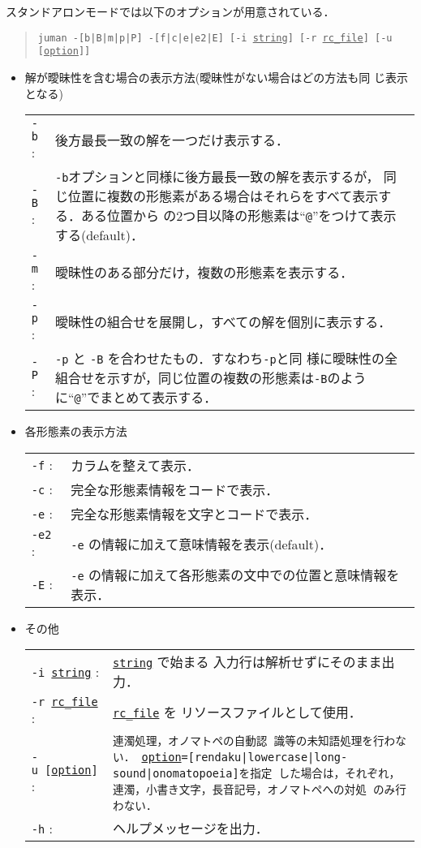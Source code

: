 \documentclass[a4j,titlepage]{jarticle}
\begin{document}
スタンドアロンモードでは以下のオプションが用意されている．
\begin{quote}
  {\tt juman -[b|B|m|p|P] -[f|c|e|e2|E] [-i \underline{string}] 
    [-r \underline{rc\_file}] [-u [\underline{option}]]}
\end{quote}
\begin{itemize}
\item 解が曖昧性を含む場合の表示方法(曖昧性がない場合はどの方法も同
  じ表示となる) \\
  \begin{tabular}{lp{11cm}}
    {\tt -b} : & 後方最長一致の解を一つだけ表示する．\\
    {\tt -B} : & {\tt -b}オプションと同様に後方最長一致の解を表示するが，
    同じ位置に複数の形態素がある場合はそれらをすべて表示する．ある位置から
    の2つ目以降の形態素は``{\tt @}''をつけて表示する(default)．\\
    {\tt -m} : & 曖昧性のある部分だけ，複数の形態素を表示する．\\
    {\tt -p} : & 曖昧性の組合せを展開し，すべての解を個別に表示する．\\
    {\tt -P} : & {\tt -p} と {\tt -B} を合わせたもの．すなわち{\tt -p}と同
    様に曖昧性の全組合せを示すが，同じ位置の複数の形態素は{\tt -B}のよう
    に``{\tt @}''でまとめて表示する．
  \end{tabular}
\item 各形態素の表示方法 \\
  \begin{tabular}{lp{11cm}}
    {\tt -f} : & カラムを整えて表示．\\
    {\tt -c} : & 完全な形態素情報をコードで表示．\\
    {\tt -e} : & 完全な形態素情報を文字とコードで表示．\\
    {\tt -e2} : & {\tt -e} の情報に加えて意味情報を表示(default)．\\
    {\tt -E} : & {\tt -e} の情報に加えて各形態素の文中での位置と意味情報を表示．\\
  \end{tabular}
\item その他 \\
  \begin{tabular}{lp{11cm}}
    {\tt -i\ \underline{string}} : & {\tt \underline{string}} で始まる
    入力行は解析せずにそのまま出力．\\
    {\tt -r\ \underline{rc\_file}} : & {\tt \underline{rc\_file}} を 
    リソースファイルとして使用．\\
    {\tt -u\ [\underline{option}]} : & {\tt 連濁処理，オノマトペの自動認
   識等の未知語処理を行わない．
   \underline{option}=[rendaku|lowercase|long-sound|onomatopoeia]を指定
   した場合は，それぞれ，連濁，小書き文字，長音記号，オノマトペへの対処
   のみ行わない．}\\
    {\tt -h} : & ヘルプメッセージを出力．\\
  \end{tabular}
\end{itemize}
\end{document}
